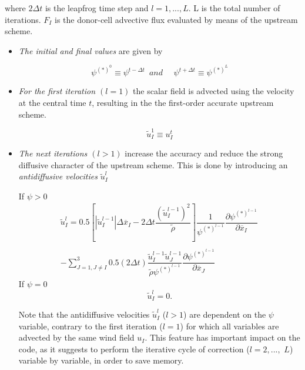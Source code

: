 \noindent
where $2\Delta t$ is the leapfrog time step and $l=1,...,L$.
 L is the total number of iterations.
$F_I$ is the donor-cell advective flux evaluated by means of the
upstream scheme.

\begin{itemize}

\item {\em The initial and final values} are given by

\begin{equation}
\psi^{(*)^{0}}\equiv \psi^{t-\Delta t} \, \, \, and \, \, \, \, \, \, \, \,
\psi^{t+\Delta t}\equiv \psi^{(*)^{L}}
\end{equation}

\item {\em For the first iteration $(l=1)$} the scalar field is advected using
the velocity at the central time $t$, resulting in the the first-order accurate
upstream scheme.

\begin{equation}
\tilde{u}_I^{1}\equiv {u}_{I}^{t}
\end{equation}

\item {\em The next iterations $(l>1)$} increase the accuracy and
reduce the strong diffusive character of the upstream scheme. This
is done by introducing an
{\em antidiffusive velocities} $\tilde{u}_I^{l}$

If $\psi > 0$
\begin{eqnarray}
\tilde{u}_{I}^{l}  =
0.5 \left[ |{\tilde{u}_I^{l-1}}| \Delta \overline{x}_I
       -{2 \Delta t}\dfrac{(\tilde{u}_I^{l-1})^{2}} {\tilde{\rho}}  \right]
\dfrac{1}{\psi^{(*)^{l-1}}}
\dfrac{\partial \psi^{(*)^{l-1}}}{\partial \overline{x}_I} \,
\nonumber \\
\nonumber \\
- \sum_{J=1,J\neq I}^{3}  0.5({2 \Delta t})
\dfrac{ \tilde{u}_I^{l-1}\tilde{u}_J^{l-1} } {\tilde{\rho} \psi^{(*)^{l-1}}}
\dfrac{\partial \psi^{(*)^{l-1}}}{\partial \overline{x}_J}
\end{eqnarray}
If $\psi = 0$
\begin{equation}
\tilde{u}_I^{l}  = 0.
\end{equation}

 Note that the antidiffusive velocities
$\tilde{u}_I^{l}$ ($l>1$) are dependent on the $\psi$ variable, contrary to
the first iteration ($l=1$) for which all variables are advected by
the same wind field ${u}_{I}$. This feature has
important impact on the code, as it suggests to perform the iterative cycle
of correction ($l=2,...,$ $ L$) variable by variable, in order to save memory.

\end{itemize}

